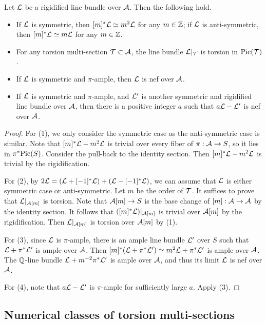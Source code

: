 \documentclass[12pt]{amsart}
\begin{document}
\begin{lemma} \label{line bundle}
Let ${\mathcal L}$ be a rigidified line bundle over ${\mathcal A}$. 
Then the following hold.
\begin{itemize}
\item[(1)] If ${\mathcal L}$ is symmetric, then $[m]^*{\mathcal L}\simeq m^2{\mathcal L}$ for any $m\in {\mathbb Z}$; if ${\mathcal L}$ is anti-symmetric, then $[m]^*{\mathcal L}\simeq m{\mathcal L}$ for any $m\in {\mathbb Z}$.
\item[(2)] For any torsion multi-section ${\mathcal T}\subset {\mathcal A}$, the line bundle ${\mathcal L}|_{{\mathcal T}}$ is torsion in ${\rm Pic}({\mathcal T})$.
\item[(3)] If ${\mathcal L}$ is symmetric and $\pi$-ample, then ${\mathcal L}$ is nef over ${\mathcal A}$. 
\item[(4)] If ${\mathcal L}$ is symmetric and $\pi$-ample, and ${\mathcal L}'$ is another symmetric and rigidified line bundle over ${\mathcal A}$, then there is a positive integer $a$ such that $a{\mathcal L}-{\mathcal L}'$ is nef over ${\mathcal A}$. 
\end{itemize}
\end{lemma}

\begin{proof}
For (1), we only consider the symmetric case as the anti-symmetric case is similar. 
Note that $[m]^*{\mathcal L}- m^2{\mathcal L}$ is trivial over every fiber of $\pi:{\mathcal A}\to S$, so it lies in $\pi^*{\rm Pic}(S)$. Consider the pull-back to the identity section. Then $[m]^*{\mathcal L}- m^2{\mathcal L}$ is trivial by the rigidification. 

For (2), by $2{\mathcal L}=({\mathcal L}+[-1]^*{\mathcal L})+({\mathcal L}-[-1]^*{\mathcal L})$, we can assume that ${\mathcal L}$ is either symmetric case or anti-symmetric. Let $m$ be the order of ${\mathcal T}$. It suffices to prove that ${\mathcal L}|_{{\mathcal A}[m]}$ is torsion. Note that ${\mathcal A}[m]\to S$ is the base change of $[m]:{\mathcal A}\to {\mathcal A}$ by the identity section. 
It follows that $([m]^*{\mathcal L})|_{{\mathcal A}[m]}$ is trivial over ${\mathcal A}[m]$ by the rigidification. 
Then ${\mathcal L}|_{{\mathcal A}[m]}$ is torsion over ${\mathcal A}[m]$ by (1).

For (3), since ${\mathcal L}$ is $\pi$-ample, there is an ample line bundle ${\mathcal L}'$ over $S$ such that ${\mathcal L}+\pi^*{\mathcal L}'$ is ample over ${\mathcal A}$. 
Then $[m]^*({\mathcal L}+\pi^*{\mathcal L}')\simeq m^2{\mathcal L}+\pi^*{\mathcal L}'$ is ample over ${\mathcal A}$.
The ${\mathbb Q}$-line bundle ${\mathcal L}+m^{-2}\pi^*{\mathcal L}'$ is ample over ${\mathcal A}$, and thus its limit ${\mathcal L}$ is nef over ${\mathcal A}$.

For (4), note that $a{\mathcal L}-{\mathcal L}'$ is $\pi$-ample for sufficiently large $a$. Apply (3). 
\end{proof}


\subsection{Numerical classes of torsion multi-sections}
\end{document}
